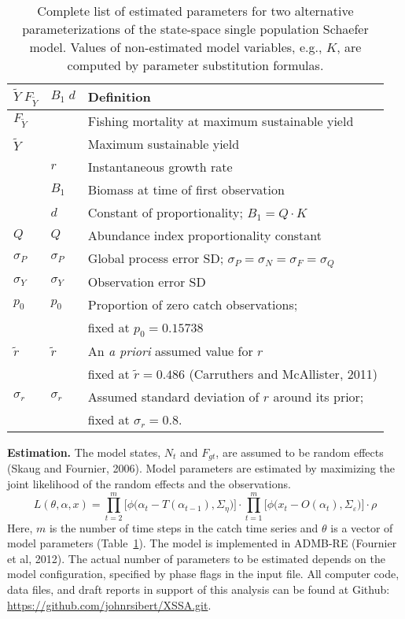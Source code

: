 \documentclass[12pt,letterpaper,twoside]{article}
\newcommand\MSY{\widetilde{Y}}
\newcommand\Fmsy{F_{\MSY}}
\begin{document}
\begin{table}
\caption{Complete list of estimated parameters for two alternative
parameterizations of the state-space single population Schaefer model.
Values of non-estimated model variables, e.g., $K$, are computed by
parameter substitution formulas.}
\label{tab:allvars1}
\begin{center}
\begin{tabular}{lll}
\hline
$\MSY\;\Fmsy$ & $B_1\;d$ & Definition\\
\hline
\hline
$\Fmsy$&  & Fishing mortality at maximum sustainable yield\\
$\MSY$ &  & Maximum sustainable yield\\
    & $r$ & Instantaneous growth rate\\
    & $B_1$ & Biomass at time of first observation\\
    &  $d $ & Constant of proportionality; $B_1=Q\cdot K$\\
$Q$ & $Q$ & Abundance index proportionality constant\\
$\sigma_P$ & $\sigma_P$ & Global process error SD; $\sigma_P=\sigma_N=\sigma_F=\sigma_Q$\\
$\sigma_Y$ & $\sigma_Y$ & Observation error SD \\
\hline
$p_0$ & $p_0$ & Proportion of zero catch observations;\\
      &       & fixed at $p_0 = 0.15738$\\
$\tilde{r}$ & $\tilde{r}$ & An {\it a priori} assumed value for $r$\\
            &             & fixed at $\tilde{r}=0.486$ (Carruthers and McAllister, 2011)\\
$\sigma_r$  & $\sigma_r$  & Assumed standard deviation of $r$ around its prior;\\
            &             & fixed at $\sigma_r=0.8$.\\
\hline
\end{tabular}
\end{center}
\end{table}



{\bf Estimation.} The model states, $N_t$ and $F_{gt}$, are assumed to be random
effects (Skaug and Fournier, 2006). Model parameters are estimated by
maximizing the joint likelihood of the random
effects and the observations.
\begin{equation}
\label{eqn:likelihood}
L(\theta,\alpha,x)=
\prod^m_{t=2}\big[\phi\big(\alpha_t-T(\alpha_{t-1}), \Sigma_\eta\big)\big]\cdot
\prod^m_{t=1}\big[\phi\big(x_t-O(\alpha_t),
\Sigma_\varepsilon\big)\big]\cdot\rho
\end{equation}
Here, $m$ is the number of time steps in the catch time series and
$\theta$ is a vector of model parameters (Table~\ref{tab:allvars1}).
The model is implemented in ADMB-RE (Fournier et al, 2012).
The actual number of
parameters to be estimated depends on the model configuration,
specified by phase flags in the input file. 
All computer code, data files, and draft reports in support of this
analysis can be found at Github:
\url{https://github.com/johnrsibert/XSSA.git}.



\clearpage

\end{document}
